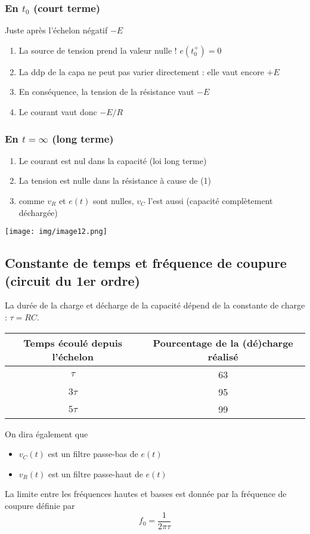 \documentclass	[11pt, a4paper, openany]{book}
\begin{document}
\subsubsection{En $t_0$ (court terme)}
Juste après l'échelon négatif $-E$
\begin{enumerate}
\item La source de tension prend la valeur nulle ! $e(t_0^+) = 0$
\item La ddp de la capa ne peut pas varier directement : elle vaut encore $+E$
\item En conséquence, la tension de la résistance vaut $-E$
\item Le courant vaut donc $-E/R$
\end{enumerate}

\subsubsection{En $t = \infty$ (long terme)}
\begin{enumerate}
\item Le courant est nul dans la capacité (loi long terme)
\item La tension est nulle dans la résistance à cause de (1)
\item comme $v_R$ et $e(t)$ sont nulles, $v_C$ l'est aussi (capacité complètement déchargée)
\end{enumerate}
\begin{center}
\texttt{[image: img/image12.png]}
\end{center}

\subsection{Constante de temps et fréquence de coupure (circuit du 1er ordre)}
La durée de la charge et décharge de la capacité dépend de la constante de charge : $\tau = RC$.
\begin{center}
\begin{tabular}{|c|c|}
\hline 
Temps écoulé depuis l'échelon & Pourcentage de la (dé)charge réalisé \\ 
\hline 
$\tau$ & 63 \\ 
\hline 
$3\tau$ & 95 \\ 
\hline 
$5\tau$ & 99 \\ 
\hline 
\end{tabular} 
\end{center}
On dira également que
\begin{itemize}
\item $v_C(t)$ est un filtre passe-bas de $e(t)$
\item $v_R(t)$ est un filtre passe-haut de $e(t)$
\end{itemize}
La limite entre les fréquences hautes et basses est donnée par la fréquence de coupure définie par
\begin{equation}
f_0 = \frac{1}{2\pi\tau}
\end{equation}
\end{document}
